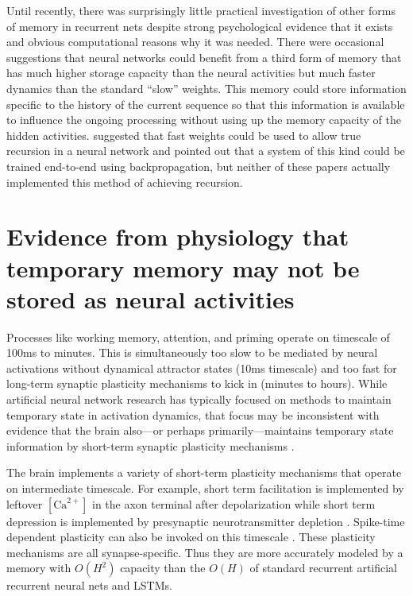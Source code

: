 \documentclass{article}
\begin{document}
Until recently, there was surprisingly little practical investigation of other forms of memory in recurrent nets despite strong psychological evidence that it exists and obvious computational reasons why it was needed. There were occasional suggestions that neural networks could benefit from a third form of memory that has much higher storage capacity than the neural activities but much faster dynamics than the standard “slow” weights. This memory could store information specific to the history of the current sequence so that this information is available to influence the ongoing processing without using up the memory capacity of the hidden activities. \citet{hinton1987using} suggested that fast weights could be used to allow true recursion in a neural network and \citet{schmidhuber1993reducing} pointed out that a system of this kind could be trained end-to-end using backpropagation, but neither of these papers actually implemented this method of achieving recursion. 

\section{Evidence from physiology that temporary memory may not be stored as neural activities} 

Processes like working memory, attention, and priming operate on timescale of 100ms to minutes. This is simultaneously too slow to be mediated by neural activations without dynamical attractor states (10ms timescale) and too fast for long-term synaptic plasticity mechanisms to kick in (minutes to hours). While artificial neural network research has typically focused on methods to maintain temporary state in activation dynamics, that focus may be inconsistent with evidence that the brain also---or perhaps primarily---maintains temporary state information by short-term synaptic plasticity mechanisms \citep{tsodyks1998neural,  abbott2004synaptic, barak2007persistent}.

The brain implements a variety of short-term plasticity mechanisms that operate on intermediate timescale. For example, short term facilitation is implemented by leftover  $[\text{Ca}^{2+}]$ in the axon terminal after depolarization while short term depression is implemented by presynaptic neurotransmitter depletion \cite{zucker2002short}. Spike-time dependent plasticity can also be invoked on this timescale \citep{markram1997regulation, bi1998synaptic}. These plasticity mechanisms are all synapse-specific. Thus they are more accurately modeled by a memory with $O(H^2)$ capacity than the $O(H)$ of standard recurrent artificial recurrent neural nets and LSTMs. 
\end{document}
